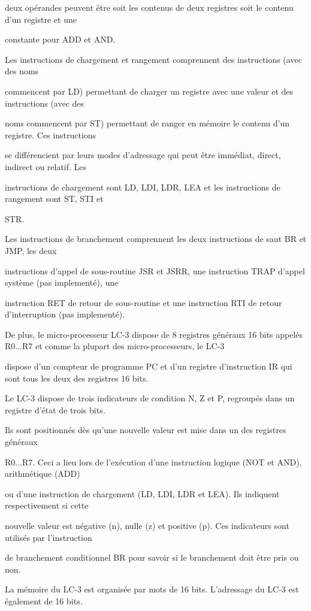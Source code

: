 \documentclass{article}
\begin{document}
deux opérandes peuvent être soit les contenus de deux registres soit le contenu d’un registre et une

constante pour ADD et AND.

Les instructions de chargement et rangement comprennent des instructions (avec des noms

commencent par LD) permettant de charger un registre avec une valeur et des instructions (avec des

noms commencent par ST) permettant de ranger en mémoire le contenu d’un registre. Ces instructions

se différencient par leurs modes d’adressage qui peut être immédiat, direct, indirect ou relatif. Les

instructions de chargement sont LD, LDI, LDR, LEA et les instructions de rangement sont ST, STI et


STR.


Les instructions de branchement comprennent les deux instructions de saut BR et JMP, les deux

instructions d’appel de sous-routine JSR et JSRR, une instruction TRAP d’appel système (pas implementé), une

instruction RET de retour de sous-routine et une instruction RTI de retour d’interruption (pas implementé).


De plus, le micro-processeur LC-3 dispose de 8 registres généraux 16 bits appelés R0...R7 et comme la plupart des micro-processeurs, le LC-3 

dispose d’un compteur de programme PC et d’un registre d’instruction IR qui sont tous les deux des registres 16 bits.

Le LC-3 dispose de trois indicateurs de condition N, Z et P, regroupés dans un registre d'état de trois bits.

Ils sont positionnés dès qu’une nouvelle valeur est mise dans un des registres généraux


R0...R7. Ceci a lieu lors de l’exécution d’une instruction logique (NOT et AND), arithmétique (ADD)

ou d’une instruction de chargement (LD, LDI, LDR et LEA). Ils indiquent respectivement si cette

nouvelle valeur est négative (n), nulle (z) et positive (p). Ces indicateurs sont utilisés par l’instruction

de branchement conditionnel BR pour savoir si le branchement doit être pris ou non.

La mémoire du LC-3 est organisée par mots de 16 bits. L’adressage du LC-3 est également de 16 bits.
\end{document}
